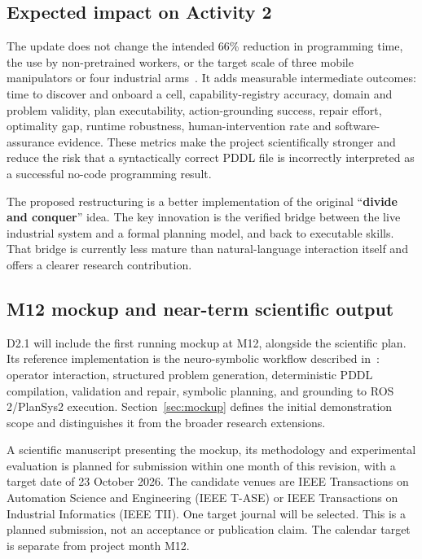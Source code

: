 \documentclass{plan4ari_report}
\begin{document}
\subsection{Expected impact on Activity 2}
The update does not change the intended 66\% reduction in programming time, the use by non-pretrained workers, or the target scale of three mobile manipulators or four industrial arms~\cite{plan4ari_pd}. It adds measurable intermediate outcomes: time to discover and onboard a cell, capability-registry accuracy, domain and problem validity, plan executability, action-grounding success, repair effort, optimality gap, runtime robustness, human-intervention rate and software-assurance evidence. These metrics make the project scientifically stronger and reduce the risk that a syntactically correct PDDL file is incorrectly interpreted as a successful no-code programming result.

\begin{planbox}
The proposed restructuring is a better implementation of the original ``\textbf{divide and conquer}'' idea. The key innovation is the verified bridge between the live industrial system and a formal planning model, and back to executable skills. That bridge is currently less mature than natural-language interaction itself and offers a clearer research contribution.
\end{planbox}

\subsection{M12 mockup and near-term scientific output}
D2.1 will include the first running mockup at M12, alongside the scientific plan. Its reference implementation is the neuro-symbolic workflow described in~\cite{sandrini2026proposal}: operator interaction, structured problem generation, deterministic PDDL compilation, validation and repair, symbolic planning, and grounding to ROS\,2/PlanSys2 execution. Section~\ref{sec:mockup} defines the initial demonstration scope and distinguishes it from the broader research extensions.

A scientific manuscript presenting the mockup, its methodology and experimental evaluation is planned for submission within one month of this revision, with a target date of 23 October 2026. The candidate venues are IEEE Transactions on Automation Science and Engineering (IEEE T-ASE) or IEEE Transactions on Industrial Informatics (IEEE TII). One target journal will be selected. This is a planned submission, not an acceptance or publication claim. The calendar target is separate from project month M12.
\end{document}
